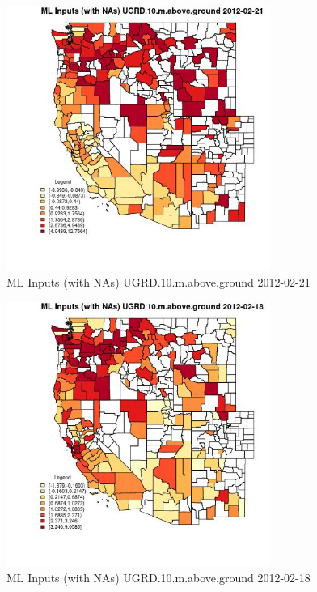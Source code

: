\begin{figure} 
\centering  
\includegraphics[width=0.77\textwidth]{Code_Outputs/Report_ML_input_PM25_Step4_part_f_de_duplicated_aves_prioritize_24hr_obswNAs_CountyUGRD10mabovegroundMean2012-02-21.jpg} 
\caption{\label{fig:Report_ML_input_PM25_Step4_part_f_de_duplicated_aves_prioritize_24hr_obswNAsCountyUGRD10mabovegroundMean2012-02-21}ML Inputs (with NAs) UGRD.10.m.above.ground 2012-02-21} 
\end{figure} 
 

\begin{figure} 
\centering  
\includegraphics[width=0.77\textwidth]{Code_Outputs/Report_ML_input_PM25_Step4_part_f_de_duplicated_aves_prioritize_24hr_obswNAs_CountyUGRD10mabovegroundMean2012-02-18.jpg} 
\caption{\label{fig:Report_ML_input_PM25_Step4_part_f_de_duplicated_aves_prioritize_24hr_obswNAsCountyUGRD10mabovegroundMean2012-02-18}ML Inputs (with NAs) UGRD.10.m.above.ground 2012-02-18} 
\end{figure} 
 

